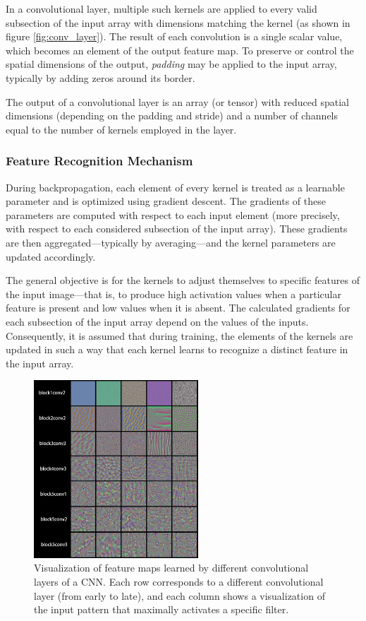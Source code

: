 \documentclass{pracalicmgr}
\begin{document}
In a convolutional layer, multiple such kernels are applied to every valid subsection of the input array with dimensions matching the kernel (as shown in figure \ref{fig:conv_layer}). The result of each convolution is a single scalar value, which becomes an element of the output feature map. To preserve or control the spatial dimensions of the output, \textit{padding} may be applied to the input array, typically by adding zeros around its border.

The output of a convolutional layer is an array (or tensor) with reduced spatial dimensions (depending on the padding and stride) and a number of channels equal to the number of kernels employed in the layer.

\subsubsection{Feature Recognition Mechanism}

During backpropagation, each element of every kernel is treated as a learnable parameter and is optimized using gradient descent. The gradients of these parameters are computed with respect to each input element (more precisely, with respect to each considered subsection of the input array). These gradients are then aggregated—typically by averaging—and the kernel parameters are updated accordingly.

The general objective is for the kernels to adjust themselves to specific features of the input image—that is, to produce high activation values when a particular feature is present and low values when it is absent. The calculated gradients for each subsection of the input array depend on the values of the inputs. Consequently, it is assumed that during training, the elements of the kernels are updated in such a way that each kernel learns to recognize a distinct feature in the input array.

\begin{figure}[H]
    \centering
    \includegraphics[width=0.55\textwidth]{src/convViz.png}
    \caption{Visualization of feature maps learned by different convolutional layers of a CNN. Each row corresponds to a different convolutional layer (from early to late), and each column shows a visualization of the input pattern that maximally activates a specific filter. \cite{exCNN}}
    \label{fig:convviz}
\end{figure}
\end{document}
